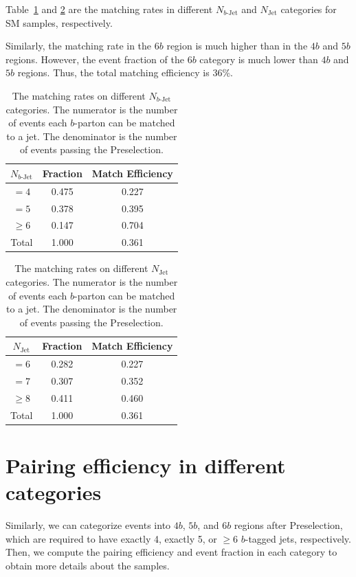 \documentclass[12pt]{article}
\begin{document}
    Table~\ref{tab:sm_match_rate_nbj} and \ref{tab:sm_match_rate_nj} are the matching rates in different $N_{b\text{-Jet}}$ and $N_{\text{Jet}}$ categories for SM samples, respectively.

    Similarly, the matching rate in the $6b$ region is much higher than in the $4b$ and $5b$ regions. However, the event fraction of the $6b$ category is much lower than $4b$ and $5b$ regions. Thus, the total matching efficiency is 36\%.
    \begin{table}[htpb]
		\centering
        \caption{The matching rates on different $N_{b\text{-Jet}}$ categories. The numerator is the number of events each $b$-parton can be matched to a jet. The denominator is the number of events passing the Preselection.}
		\label{tab:sm_match_rate_nbj}
		\begin{tabular}{c|c|c}
        $N_{b\text{-Jet}}$    & Fraction  & Match Efficiency     \\ \hline
        $=4$                  & 0.475 & 0.227 \\
        $=5$                  & 0.378 & 0.395 \\
        $\ge 6$               & 0.147 & 0.704 \\ \hline
        Total                 & 1.000 & 0.361
		\end{tabular}
	\end{table}
    \begin{table}[htpb]
		\centering
        \caption{The matching rates on different $N_{\text{Jet}}$ categories. The numerator is the number of events each $b$-parton can be matched to a jet. The denominator is the number of events passing the Preselection.}
		\label{tab:sm_match_rate_nj}
		\begin{tabular}{c|c|c}
        $N_{\text{Jet}}$    & Fraction  & Match Efficiency     \\ \hline
        $=6$                  & 0.282 & 0.227 \\
        $=7$                  & 0.307 & 0.352 \\
        $\ge 8$               & 0.411 & 0.460 \\ \hline
        Total                 & 1.000 & 0.361
		\end{tabular}
	\end{table}
\section{Pairing efficiency in different categories}%
\label{sec:pairing_efficiency_in_different_categories}
    Similarly, we can categorize events into $4b$,  $5b$, and $6b$ regions after Preselection, which are required to have exactly 4, exactly 5, or $\ge 6$ $b$-tagged jets, respectively. Then, we compute the pairing efficiency and event fraction in each category to obtain more details about the samples.
\end{document}
